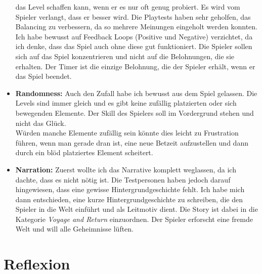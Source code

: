 \documentclass{article}
\begin{document}
\begin{itemize}
    das Level schaffen kann, wenn er es nur oft genug probiert. Es wird vom Spieler verlangt, dass er besser wird. Die Playtests haben sehr geholfen, das Balancing zu verbessern, da so mehrere Meinungen
    eingeholt werden konnten. \\
    Ich habe bewusst auf Feedback Loops (Positive und Negative) verzichtet, da ich denke, dass das Spiel auch ohne diese gut funktioniert. Die Spieler sollen sich auf das Spiel konzentrieren und nicht auf die
    Belohnungen, die sie erhalten. Der Timer ist die einzige Belohnung, die der Spieler erhält, wenn er das Spiel beendet.
    \item \textbf{Randomness:} Auch den Zufall habe ich bewusst aus dem Spiel gelassen. Die Levels sind immer gleich und es gibt keine zufällig platzierten oder sich bewegenden Elemente.
    Der Skill des Spielers soll im Vordergrund stehen und nicht das Glück. \\
    Würden manche Elemente zufällig sein könnte dies leicht zu Frustration führen, wenn man gerade dran ist, eine neue Betzeit aufzustellen und dann durch ein blöd platziertes Element scheitert.
    \item \textbf{Narration:} Zuerst wollte ich das Narrative komplett weglassen, da ich dachte, dass es nicht nötig ist. Die Testpersonen haben jedoch darauf hingewiesen, dass eine gewisse Hintergrundgeschichte
    fehlt. Ich habe mich dann entschieden, eine kurze Hintergrundgeschichte zu schreiben, die den Spieler in die Welt einführt und als Leitmotiv dient. Die Story ist dabei in die Kategorie \textit{Voyage and Return}
    einzuordnen. Der Spieler erforscht eine fremde Welt und will alle Geheimnisse lüften.
\end{itemize}

\newpage
\section{Reflexion}
\end{document}
